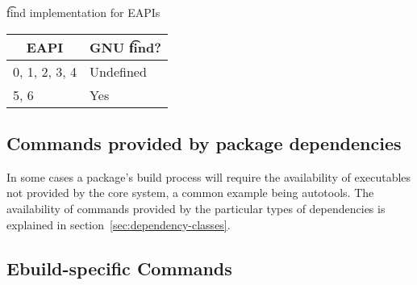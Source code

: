 \begin{centertable}{\t{find} implementation for EAPIs}
    \label{tab:system-commands-table}
    \begin{tabular}{ll}
      \toprule
      \multicolumn{1}{c}{\textbf{EAPI}} &
      \multicolumn{1}{c}{\textbf{GNU \t{find}?}} \\
      \midrule
      0, 1, 2, 3, 4     & Undefined \\
      5, 6              & Yes       \\
      \bottomrule
    \end{tabular}
\end{centertable}

\subsection{Commands provided by package dependencies}

In some cases a package's build process will require the availability of executables not provided by
the core system, a common example being autotools. The availability of commands provided by the
particular types of dependencies is explained in section~\ref{sec:dependency-classes}.

\subsection{Ebuild-specific Commands}




